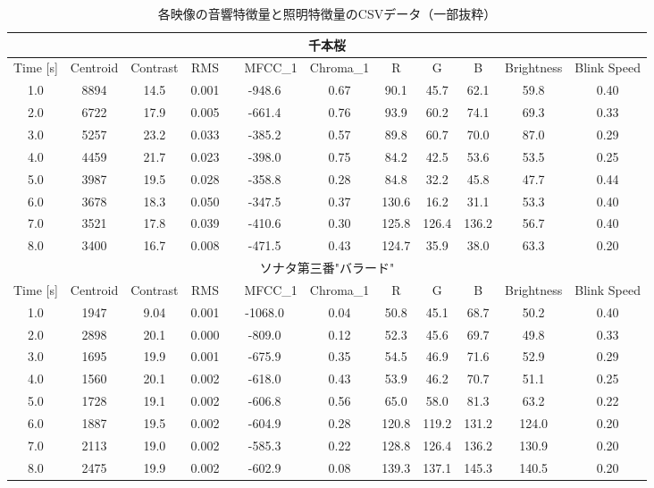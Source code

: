 \begin{table}[t]
\centering
\small
\caption{各映像の音響特徴量と照明特徴量のCSVデータ（一部抜粋）}
\label{tab:csv-live}
\begin{tabular}{c|cccccccccc}
\hline
\multicolumn{11}{c}{千本桜} \\
\hline
\hline
Time [s] & Centroid & Contrast & RMS &　MFCC\_1 & Chroma\_1 & R & G & B
 & Brightness & Blink Speed  \\
\hline
1.0 & 8894 & 14.5 & 0.001 & -948.6 & 0.67 & 90.1 & 45.7 & 62.1 & 59.8 & 0.40 \\
2.0 & 6722 & 17.9 & 0.005 & -661.4 & 0.76 & 93.9 & 60.2 & 74.1 & 69.3 & 0.33 \\
3.0 & 5257 & 23.2 & 0.033 & -385.2 & 0.57 & 89.8 & 60.7 & 70.0 & 87.0 & 0.29 \\
4.0 & 4459 & 21.7 & 0.023 & -398.0 & 0.75 & 84.2 & 42.5 & 53.6 & 53.5 & 0.25 \\
5.0 & 3987 & 19.5 & 0.028 & -358.8 & 0.28 & 84.8 & 32.2 & 45.8 & 47.7 & 0.44 \\
6.0 & 3678 & 18.3 & 0.050 & -347.5 & 0.37 & 130.6 & 16.2 & 31.1 & 53.3 & 0.40 \\
7.0 & 3521 & 17.8 & 0.039 & -410.6 & 0.30 & 125.8 & 126.4 & 136.2 & 56.7 & 0.40 \\
8.0 & 3400 & 16.7 & 0.008 & -471.5 & 0.43 & 124.7 & 35.9 & 38.0 & 63.3 & 0.20 \\
\hline
\multicolumn{11}{c}{ソナタ第三番"バラード"} \\
\hline
\hline
Time [s] & Centroid & Contrast & RMS &　MFCC\_1 & Chroma\_1 & R & G & B
 & Brightness & Blink Speed  \\
\hline
1.0 & 1947 & 9.04 & 0.001 & -1068.0 & 0.04 & 50.8 & 45.1 & 68.7 & 50.2 & 0.40 \\
2.0 & 2898 & 20.1 & 0.000 & -809.0 & 0.12 & 52.3 & 45.6 & 69.7 & 49.8 & 0.33 \\
3.0 & 1695 & 19.9 & 0.001 & -675.9 & 0.35 & 54.5 & 46.9 & 71.6 & 52.9 & 0.29 \\
4.0 & 1560 & 20.1 & 0.002 & -618.0 & 0.43 & 53.9 & 46.2 & 70.7 & 51.1 & 0.25 \\
5.0 & 1728 & 19.1 & 0.002 & -606.8 & 0.56 & 65.0 & 58.0 & 81.3 & 63.2 & 0.22\\
6.0 & 1887 & 19.5 & 0.002 & -604.9 & 0.28 & 120.8 & 119.2 & 131.2 & 124.0 & 0.20 \\
7.0 & 2113 & 19.0 & 0.002 & -585.3 & 0.22 & 128.8 & 126.4 & 136.2 & 130.9 & 0.20 \\
8.0 & 2475 & 19.9 & 0.002 & -602.9 & 0.08 & 139.3 & 137.1 & 145.3 & 140.5 & 0.20 \\

\end{tabular}
\end{table}
